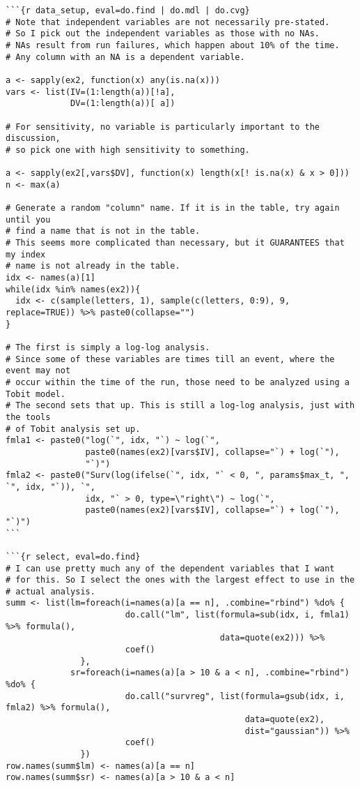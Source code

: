 \begin{lstlisting}[basicstyle=\scriptsize]
```{r data_setup, eval=do.find | do.mdl | do.cvg}
# Note that independent variables are not necessarily pre-stated.
# So I pick out the independent variables as those with no NAs.
# NAs result from run failures, which happen about 10% of the time.
# Any column with an NA is a dependent variable.

a <- sapply(ex2, function(x) any(is.na(x)))
vars <- list(IV=(1:length(a))[!a],
             DV=(1:length(a))[ a])

# For sensitivity, no variable is particularly important to the discussion,
# so pick one with high sensitivity to something.

a <- sapply(ex2[,vars$DV], function(x) length(x[! is.na(x) & x > 0]))
n <- max(a)

# Generate a random "column" name. If it is in the table, try again until you
# find a name that is not in the table.
# This seems more complicated than necessary, but it GUARANTEES that my index
# name is not already in the table.
idx <- names(a)[1]
while(idx %in% names(ex2)){
  idx <- c(sample(letters, 1), sample(c(letters, 0:9), 9, replace=TRUE)) %>% paste0(collapse="")
}

# The first is simply a log-log analysis.
# Since some of these variables are times till an event, where the event may not
# occur within the time of the run, those need to be analyzed using a Tobit model.
# The second sets that up. This is still a log-log analysis, just with the tools
# of Tobit analysis set up.
fmla1 <- paste0("log(`", idx, "`) ~ log(`",
                paste0(names(ex2)[vars$IV], collapse="`) + log(`"),
                "`)")
fmla2 <- paste0("Surv(log(ifelse(`", idx, "` < 0, ", params$max_t, ", `", idx, "`)), `",
                idx, "` > 0, type=\"right\") ~ log(`",
                paste0(names(ex2)[vars$IV], collapse="`) + log(`"), "`)")
```

```{r select, eval=do.find}
# I can use pretty much any of the dependent variables that I want
# for this. So I select the ones with the largest effect to use in the
# actual analysis.
summ <- list(lm=foreach(i=names(a)[a == n], .combine="rbind") %do% {
                        do.call("lm", list(formula=sub(idx, i, fmla1) %>% formula(),
                                           data=quote(ex2))) %>%
                        coef()
               },
             sr=foreach(i=names(a)[a > 10 & a < n], .combine="rbind") %do% {
                        do.call("survreg", list(formula=gsub(idx, i, fmla2) %>% formula(),
                                                data=quote(ex2),
                                                dist="gaussian")) %>%
                        coef()
               })
row.names(summ$lm) <- names(a)[a == n]
row.names(summ$sr) <- names(a)[a > 10 & a < n]


\end{lstlisting}
